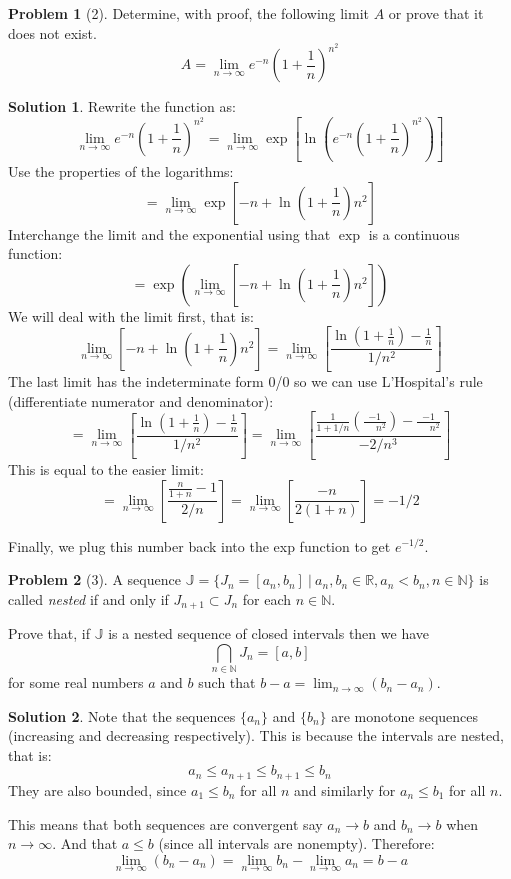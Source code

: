 \documentclass{article}
\theoremstyle{definition}
\newtheorem*{soln}{Solution}
\newtheorem*{prob}{Problem}
\theoremstyle{theorem}
\newcommand{\R}{\mathbb{R}}
\newcommand{\N}{\mathbb{N}}
\begin{document}
\begin{prob}[2]
Determine, with proof, the following limit $A$ or prove that it does not exist.
\begin{equation}\label{limit}
A = \lim_{n \to \infty} e^{-n} \left( 1 + \frac{1}{n} \right)^{n^2}
\end{equation}
\end{prob}
\begin{soln}
Rewrite the function as:
    $$\lim_{n \to \infty} e^{-n} \left( 1 + \frac{1}{n} \right)^{n^2} =\lim_{n \to \infty} \exp\left[\ln\left(e^{-n} \left( 1 + \frac{1}{n} \right)^{n^2}\right)\right]$$
Use the properties of the logarithms:
    $$=\lim_{n \to \infty} \exp\left[-n + \ln\left( 1 + \frac 1n\right)n^2\right]$$
Interchange the limit and the exponential using that $\exp$ is a continuous function:
    $$=\exp\left(\lim_{n \to \infty} \left[-n + \ln\left( 1 + \frac 1n\right)n^2\right]\right)$$
    We will deal with the limit first, that is:
    $$\lim_{n \to \infty} \left[-n + \ln\left( 1 + \frac 1n\right)n^2\right] = \lim_{n\to \infty}\left[ \frac{\ln\left(1+\frac 1n\right)- \frac 1n}{1/n^2}\right]$$
    The last limit has the indeterminate form 0/0 so we can use L'Hospital's rule (differentiate numerator and denominator):
    $$= \lim_{n\to \infty}\left[ \frac{\ln\left(1+\frac 1n\right)- \frac 1n}{1/n^2}\right]=\lim_{n\to \infty}\left[ \frac{\frac 1{1+1/n}\left(\frac{-1}{\phantom{-1}n^2}\right)- \frac{-1}{\phantom{-1}n^2}}{-2/n^3}\right] $$
    This is equal to the easier limit:
    $$=\lim_{n\to \infty} \left[ \frac{\frac n{1+n} -1 }{2/n}\right] = \lim_{n\to \infty} \left[ \frac {-n}{2(1+n)} \right]= -1/2$$
    
    Finally, we plug this number back into the exp function to get $e^{-1/2}$.

\end{soln}
\vspace{1in}



\begin{prob}[3]
A sequence $\mathbb{J} = \{ J_n = [a_n,b_n] \ | \ a_n, b_n \in \R, a_n < b_n, n \in \N\}$ is called \emph{nested} if and only if $J_{n+1} \subset J_n$ for each $n \in \N$.

Prove that, if $\mathbb{J}$ is a nested sequence of closed intervals then we have $$\bigcap_{n \in \N} J_n = [a,b]$$ for some real numbers $a$ and $b$ such that $b-a = \lim_{n \to \infty} (b_n - a_n)$.
\end{prob}
\begin{soln}
    Note that the sequences $\{a_n\}$ and $\{b_n\}$ are monotone sequences (increasing and decreasing respectively). This is because the intervals are nested, that is:
    $$a_n \leq a_{n+1} \leq b_{n+1}\leq b_n $$
    They are also bounded, since $a_1\leq b_n$ for all $n$ and similarly for $a_n \leq b_1$ for all $n$. 

    This means that both sequences are convergent say $a_n \to b$ and $b_n \to b$ when $n\to \infty$. And that $a\leq b$ (since all intervals are nonempty). Therefore:
    $$\lim_{n\to \infty} (b_n -a_n) = \lim_{n\to \infty}b_n - \lim_{n\to \infty}a_n = b-a$$ 
\end{soln}
\vspace{1in}
\end{document}
